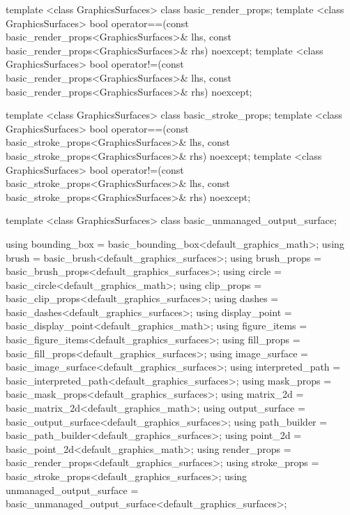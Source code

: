 \begin{codeblock}
{{{{    template <class GraphicsSurfaces>    
    class basic_render_props;
    template <class GraphicsSurfaces>
    bool operator==(const basic_render_props<GraphicsSurfaces>& lhs,
      const basic_render_props<GraphicsSurfaces>& rhs) noexcept;
    template <class GraphicsSurfaces>
    bool operator!=(const basic_render_props<GraphicsSurfaces>& lhs,
      const basic_render_props<GraphicsSurfaces>& rhs) noexcept;
    
    template <class GraphicsSurfaces>
    class basic_stroke_props;
    template <class GraphicsSurfaces>
    bool operator==(const basic_stroke_props<GraphicsSurfaces>& lhs,
      const basic_stroke_props<GraphicsSurfaces>& rhs) noexcept;
    template <class GraphicsSurfaces>
    bool operator!=(const basic_stroke_props<GraphicsSurfaces>& lhs,
      const basic_stroke_props<GraphicsSurfaces>& rhs) noexcept;
    
    template <class GraphicsSurfaces>
    class basic_unmanaged_output_surface;
  
    using bounding_box = basic_bounding_box<default_graphics_math>;
    using brush = basic_brush<default_graphics_surfaces>;
    using brush_props = basic_brush_props<default_graphics_surfaces>;
    using circle = basic_circle<default_graphics_math>;
    using clip_props = basic_clip_props<default_graphics_surfaces>;
    using dashes = basic_dashes<default_graphics_surfaces>;
    using display_point = basic_display_point<default_graphics_math>;
    using figure_items = basic_figure_items<default_graphics_surfaces>;
    using fill_props = basic_fill_props<default_graphics_surfaces>;
    using image_surface = basic_image_surface<default_graphics_surfaces>;
    using interpreted_path = basic_interpreted_path<default_graphics_surfaces>;
    using mask_props = basic_mask_props<default_graphics_surfaces>;
    using matrix_2d = basic_matrix_2d<default_graphics_math>;
    using output_surface = basic_output_surface<default_graphics_surfaces>;
    using path_builder = basic_path_builder<default_graphics_surfaces>;
    using point_2d = basic_point_2d<default_graphics_math>;
    using render_props = basic_render_props<default_graphics_surfaces>;
    using stroke_props = basic_stroke_props<default_graphics_surfaces>;
    using unmanaged_output_surface = 
      basic_unmanaged_output_surface<default_graphics_surfaces>;
    
}}}}
\end{codeblock}

